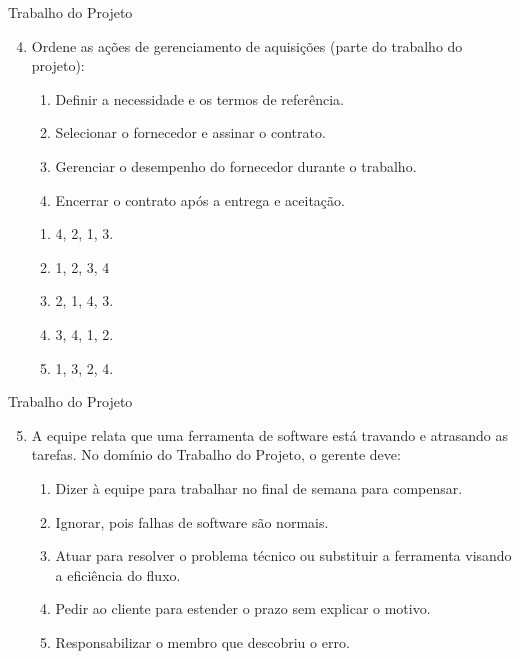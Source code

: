 \documentclass{beamer}
\begin{document}
\begin{frame}{Trabalho do Projeto}
	\begin{enumerate}
		\setcounter{enumi}{3}
		\justifying
		\item Ordene as ações de gerenciamento de aquisições (parte do trabalho do projeto):
		\begin{enumerate}[I]
			\item Definir a necessidade e os termos de referência.
			\item Selecionar o fornecedor e assinar o contrato.
			\item Gerenciar o desempenho do fornecedor durante o trabalho.
			\item Encerrar o contrato após a entrega e aceitação.
		\end{enumerate}
		\begin{enumerate}[a]
			\item 4, 2, 1, 3.
			\item \alert<2>{1, 2, 3, 4}
			\item 2, 1, 4, 3.
			\item 3, 4, 1, 2.
			\item 1, 3, 2, 4.
		\end{enumerate}
	\end{enumerate}
\end{frame}

\begin{frame}{Trabalho do Projeto}
	\begin{enumerate}
		\setcounter{enumi}{4}
		\justifying
		\item A equipe relata que uma ferramenta de software está travando e atrasando as tarefas. No domínio do Trabalho do Projeto, o gerente deve:
		\begin{enumerate}[a]
			\item Dizer à equipe para trabalhar no final de semana para compensar.
			\item Ignorar, pois falhas de software são normais.
			\item \alert<2>{Atuar para resolver o problema técnico ou substituir a ferramenta visando a eficiência do fluxo.}
			\item Pedir ao cliente para estender o prazo sem explicar o motivo.
			\item Responsabilizar o membro que descobriu o erro.
		\end{enumerate}
	\end{enumerate}
\end{frame}
\end{document}
